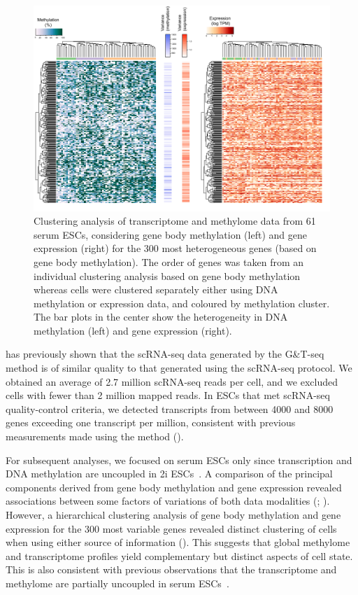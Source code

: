\begin{figure}[htbp!]
\centering
\includegraphics[width=1.0\textwidth]{heat}
\caption[Clustering analysis of transcriptome and methylome data.]{Clustering analysis of transcriptome and methylome data from 61 serum ESCs, considering gene body methylation (left) and gene expression (right) for the 300 most heterogeneous genes (based on gene body methylation). The order of genes was taken from an individual clustering analysis based on gene body methylation whereas cells were clustered separately either using DNA methylation or expression data, and coloured by methylation cluster. The bar plots in the center show the heterogeneity in DNA methylation (left) and gene expression (right).}
\label{fig:mt_heat}
\end{figure}

\citet{macaulay_g&t-seq:_2015} has previously shown that the scRNA-seq data generated by the G\&T-seq method is of similar quality to that generated using the scRNA-seq protocol. We obtained an average of 2.7 million scRNA-seq reads per cell, and we excluded cells with fewer than 2 million mapped reads. In ESCs that met scRNA-seq quality-control criteria, we detected transcripts from between 4000 and 8000 genes exceeding one transcript per million, consistent with previous measurements made using the method ().

For subsequent analyses, we focused on serum ESCs only since transcription and DNA methylation are uncoupled in 2i ESCs~\citep{ficz_fgf_2013,habibi_whole-genome_2013}. A comparison of the principal components derived from gene body methylation and gene expression revealed associations between some factors of variations of both data modalities (; ). However, a hierarchical clustering analysis of gene body methylation and gene expression for the 300 most variable genes revealed distinct clustering of cells when using either source of information (). This suggests that global methylome and transcriptome profiles yield complementary but distinct aspects of cell state. This is also consistent with previous observations that the transcriptome and methylome are partially uncoupled in serum ESCs~\citep{ficz_fgf_2013}.



